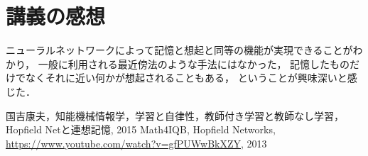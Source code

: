 \documentclass[10pt,twocolumn]{jarticle}
\begin{document}
\section{講義の感想}
ニューラルネットワークによって記憶と想起と同等の機能が実現できることがわかり，
一般に利用される最近傍法のような手法にはなかった，
記憶したものだけでなくそれに近い何かが想起されることもある，
ということが興味深いと感じた．


\begin{thebibliography}{9}
   国吉康夫，知能機械情報学，学習と自律性，教師付き学習と教師なし学習，Hopfield Netと連想記憶, 2015
   Math4IQB, Hopfield Networks, \url{https://www.youtube.com/watch?v=gfPUWwBkXZY}, 2013
\end{thebibliography}
\end{document}

